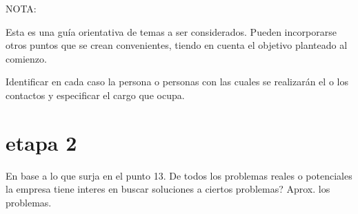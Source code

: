 \documentclass[10pt,a4paper,final]{article}
\begin{document}
NOTA:

Esta es una guía orientativa de temas a ser considerados. Pueden incorporarse otros puntos que se crean convenientes, tiendo en cuenta el objetivo planteado al comienzo.

Identificar en cada caso la persona o personas con las cuales se realizarán el o los contactos y especificar el cargo que ocupa.

\section{etapa 2}
En base a lo que surja en el punto 13. De todos los problemas reales o potenciales la empresa tiene interes en buscar soluciones a ciertos problemas?
Aprox. los problemas.
\end{document}
